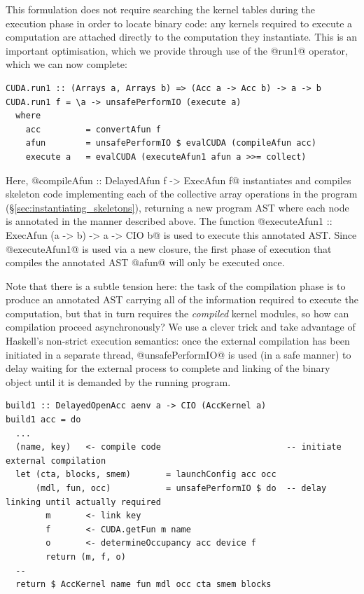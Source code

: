 This formulation does not require searching the kernel tables during the
execution phase in order to locate binary code: any kernels required to execute
a computation are attached directly to the computation they instantiate. This is
an important optimisation, which we provide through use of the @run1@
operator, which we can now complete:
%
\begin{lstlisting}[style=haskell]
CUDA.run1 :: (Arrays a, Arrays b) => (Acc a -> Acc b) -> a -> b
CUDA.run1 f = \a -> unsafePerformIO (execute a)
  where
    acc         = convertAfun f
    afun        = unsafePerformIO $ evalCUDA (compileAfun acc)
    execute a   = evalCUDA (executeAfun1 afun a >>= collect)
\end{lstlisting}
%
Here, @compileAfun :: DelayedAfun f -> ExecAfun f@ instantiates and
compiles skeleton code implementing each of the collective array operations in
the program (\S\ref{sec:instantiating_skeletons}), returning a new program AST
where each node is annotated in the manner described above. The function
@executeAfun1 :: ExecAfun (a -> b) -> a -> CIO b@ is used to execute this
annotated AST\@. Since @executeAfun1@ is used via a new closure, the first phase
of execution that compiles the annotated AST @afun@ will only be executed once.

Note that there is a subtle tension here: the task of the compilation phase is
to produce an annotated AST carrying all of the information required to execute
the computation, but that in turn requires the \emph{compiled} kernel modules,
so how can compilation proceed asynchronously? We use a clever trick and take
advantage of Haskell's non-strict execution semantics: once the external
compilation has been initiated in a separate thread, @unsafePerformIO@ is
used (in a safe manner) to delay waiting for the external process to complete
and linking of the binary object until it is demanded by the running program.
%
\begin{lstlisting}[style=haskell]
build1 :: DelayedOpenAcc aenv a -> CIO (AccKernel a)
build1 acc = do
  ...
  (name, key)   <- compile code                         -- initiate external compilation
  let (cta, blocks, smem)       = launchConfig acc occ
      (mdl, fun, occ)           = unsafePerformIO $ do  -- delay linking until actually required
        m       <- link key
        f       <- CUDA.getFun m name
        o       <- determineOccupancy acc device f
        return (m, f, o)
  --
  return $ AccKernel name fun mdl occ cta smem blocks
\end{lstlisting}


